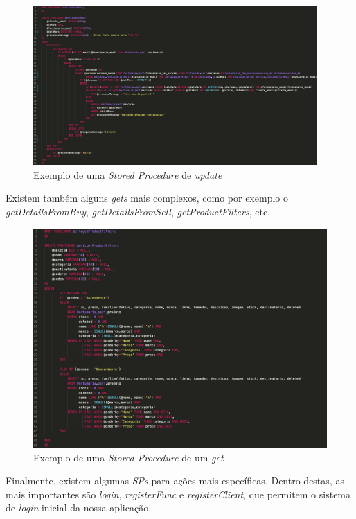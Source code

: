 \documentclass[10pt,portuguese]{article}
\begin{document}
\begin{figure}[!h]
    \centering
    \includegraphics[width=410]{images/updateMarc.png}
    \caption{Exemplo de uma \textit{Stored Procedure} de \textit{update}}
\end{figure}

\par Existem também alguns \textit{gets} mais complexos, como por exemplo o \textit{getDetailsFromBuy}, \textit{getDetailsFromSell}, \textit{getProductFilters}, etc.

\begin{figure}[!h]
    \centering
    \includegraphics[width=500]{images/getProductFilters.png}
    \caption{Exemplo de uma \textit{Stored Procedure} de um \textit{get}}
\end{figure}

\clearpage

\par Finalmente, existem algumas \textit{SPs} para ações mais específicas. Dentro destas, as mais importantes são \textit{login}, \textit{registerFunc} e \textit{registerClient}, que permitem o sistema de \textit{login} inicial da nossa aplicação.
\end{document}
